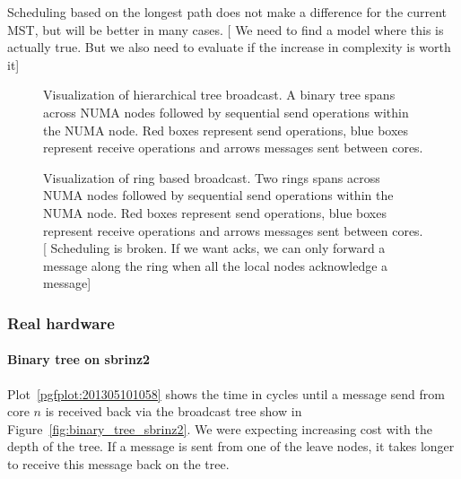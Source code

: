 \documentclass{article}
\newcommand{\stefan}[1]{
  {\color{skRed}[{\color{red}{SK}} #1]}}
\begin{document}
Scheduling based on the longest path does not make a difference for
the current MST, but will be better in many cases. \stefan{We need to
  find a model where this is actually true. But we also need to
  evaluate if the increase in complexity is worth it}

\begin{figure}[htb]
  \centering
  \begin{tikzpicture}[scale=.35,transform shape]
    
  \end{tikzpicture}
  \caption{Visualization of hierarchical tree broadcast. A binary tree
    spans across NUMA nodes followed by sequential send operations
    within the NUMA node. %
    Red boxes represent send operations, blue boxes represent receive
    operations and arrows messages sent between cores.  }
  \label{fig:visu_hierarchy}
\end{figure}

\begin{figure}[htb]
  \centering
  \begin{tikzpicture}[scale=.35,transform shape]
    
  \end{tikzpicture}
  \caption{Visualization of ring based broadcast. Two rings
    spans across NUMA nodes followed by sequential send operations
    within the NUMA node. %
    Red boxes represent send operations, blue boxes represent receive
    operations and arrows messages sent between
    cores. \stefan{Scheduling is broken. If we want acks, we can only
      forward a message along the ring when all the local nodes
      acknowledge a message}}
  \label{fig:visu_ring}
\end{figure}

\subsubsection{Real hardware}

\paragraph{Binary tree on sbrinz2}

Plot~\ref{pgfplot:201305101058} shows the time in cycles until a
message send from core $n$ is received back via the broadcast tree
show in Figure~\ref{fig:binary_tree_sbrinz2}. We were expecting
increasing cost with the depth of the tree. If a message is sent from
one of the leave nodes, it takes longer to receive this message back
on the tree.
\end{document}

